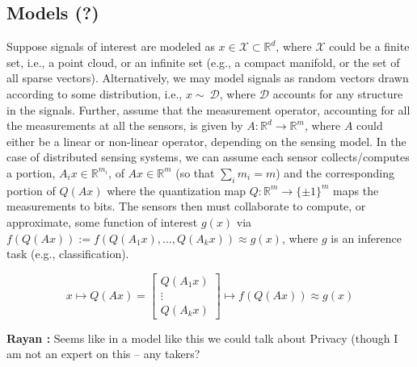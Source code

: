 \documentclass{article}
\newcommand{\comment}[3]{{\color{#1} {\bf #2 :} #3}}
\newcommand{\rayan}[1]{\comment{red}{Rayan}{#1}}
\begin{document}
\subsection{Models (?)}
Suppose signals of interest are modeled as $x\in \mathcal{X} \subset \mathbb{R}^d$, where $\mathcal{X}$ could be a finite set, i.e., a point cloud, or an infinite set (e.g., a compact manifold, or the set of all sparse vectors). Alternatively, we may model signals as random vectors drawn according to some distribution, i.e., $x\sim~\mathcal{D}$, where $\mathcal{D}$ accounts for any structure in the signals. Further, assume that the measurement operator, accounting for all the measurements at all the sensors, is given by $A:\mathbb{R}^d \to \mathbb{R}^m$, where $A$ could either be a linear or non-linear operator, depending on the sensing model.  In the case of distributed sensing systems, we can assume each sensor collects/computes a portion, $A_i x \in \mathbb{R}^{m_i}$, of $Ax \in \mathbb{R}^m$ (so that $\sum_i{m_i}=m$) and the corresponding portion of ${Q}(Ax)$ where the quantization map $Q: \mathbb{R}^m \to \{\pm 1\}^m $ maps the measurements to bits. The sensors then must collaborate to compute, or approximate, some function of interest $g(x)$ via $f(Q(Ax)):=f\left(Q(A_1x),...,Q(A_kx)\right)\approx g(x)$, where $g$ is an inference task (e.g., classification).

\begin{equation}
x 
\mapsto Q(Ax) =\left[ \begin{array}{c} Q(A_1 x) \\ \vdots \\ Q(A_k x) \end{array}\right] \mapsto f(Q(Ax))\approx g(x)
\end{equation}


\rayan{ Seems like in a model like this we could talk about Privacy (though I am not an expert on this -- any takers?} 
\end{document}
